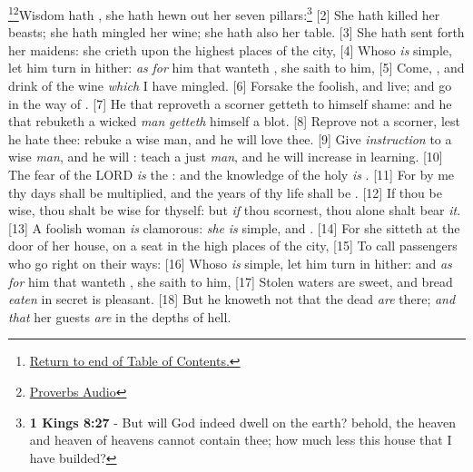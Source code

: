 \footnote{\textcolor[cmyk]{0.99998,1,0,0}{\hyperlink{TOC}{Return to end of Table of Contents.}}}\footnote{\href{https://audiobible.com/bible/proverbs_9.html}{\textcolor[cmyk]{0.99998,1,0,0}{Proverbs Audio}}}\textcolor[cmyk]{0.99998,1,0,0}{Wisdom hath , she hath hewn out her seven pillars:}\footnote{\textbf{1 Kings 8:27} - But will God indeed dwell on the earth? behold, the heaven and heaven of heavens cannot contain thee; how much less this house that I have builded?} 
[2] \textcolor[cmyk]{0.99998,1,0,0}{She hath killed her beasts; she hath mingled her wine; she hath also  her table.}
[3] \textcolor[cmyk]{0.99998,1,0,0}{She hath sent forth her maidens: she crieth upon the highest places of the city,}
[4] \textcolor[cmyk]{0.99998,1,0,0}{Whoso \emph{is} simple, let him turn in hither: \emph{as} \emph{for} him that wanteth , she saith to him,}
[5] \textcolor[cmyk]{0.99998,1,0,0}{Come,  , and drink of the wine \emph{which} I have mingled.}
[6] \textcolor[cmyk]{0.99998,1,0,0}{Forsake the foolish, and live; and go in the way of .}
[7] \textcolor[cmyk]{0.99998,1,0,0}{He that reproveth a scorner getteth to himself shame: and he that rebuketh a wicked \emph{man} \emph{getteth} himself a blot.}
[8] \textcolor[cmyk]{0.99998,1,0,0}{Reprove not a scorner, lest he hate thee: rebuke a wise man, and he will love thee.}
[9] \textcolor[cmyk]{0.99998,1,0,0}{Give \emph{instruction} to a wise \emph{man}, and he will : teach a just \emph{man}, and he will increase in learning.}
[10] \textcolor[cmyk]{0.99998,1,0,0}{The fear of the LORD \emph{is} the : and the knowledge of the holy \emph{is} .}
[11] \textcolor[cmyk]{0.99998,1,0,0}{For by me thy days shall be multiplied, and the years of thy life shall be .}
[12] \textcolor[cmyk]{0.99998,1,0,0}{If thou be wise, thou shalt be wise for thyself: but \emph{if} thou scornest, thou alone shalt bear \emph{it}.}
[13] \textcolor[cmyk]{0.99998,1,0,0}{A foolish woman \emph{is} clamorous: \emph{she} \emph{is} simple, and .}
[14] \textcolor[cmyk]{0.99998,1,0,0}{For she sitteth at the door of her house, on a seat in the high places of the city,}
[15] \textcolor[cmyk]{0.99998,1,0,0}{To call passengers who go right on their ways:}
[16] \textcolor[cmyk]{0.99998,1,0,0}{Whoso \emph{is} simple, let him turn in hither: and \emph{as} \emph{for} him that wanteth , she saith to him,}
[17] \textcolor[cmyk]{0.99998,1,0,0}{Stolen waters are sweet, and bread \emph{eaten} in secret is pleasant.}
[18] \textcolor[cmyk]{0.99998,1,0,0}{But he knoweth not that the dead \emph{are} there; \emph{and} \emph{that} her guests \emph{are} in the depths of hell.}


